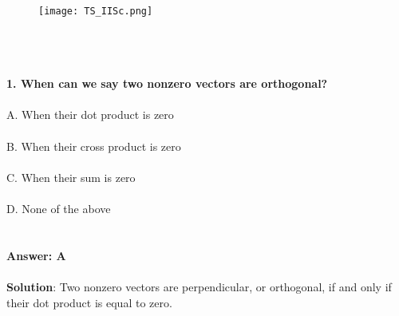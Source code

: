 \documentclass[prl,twocolumn,showpacs,preprintnumbers,superscriptaddress]{revtex4}
\theoremstyle{plain}
\theoremstyle{definition}
\begin{document}
\begin{widetext}
\\
\\
\\

\begin{wrapfigure}
\centering
\end{wrapfigure}
\begin{figure}[h!]
 \begin{right}
  \hfill\texttt{[image: TS\_IISc.png]}
 \end{right}
\end{figure}
\\
\\
\\
\noindent\textbf{1. When can we say two nonzero vectors are orthogonal?}
\\
\\
A. When their dot product is zero
\\
\\
B. When their cross product is zero
\\
\\
C. When their sum is zero
\\
\\
D. None of the above
\\
\\
\\
\textbf{Answer: A}
\\
\\
\textbf{Solution}:
Two nonzero vectors are perpendicular, or orthogonal, if and only if their dot product is equal to zero.

\end{widetext}
\end{document}

